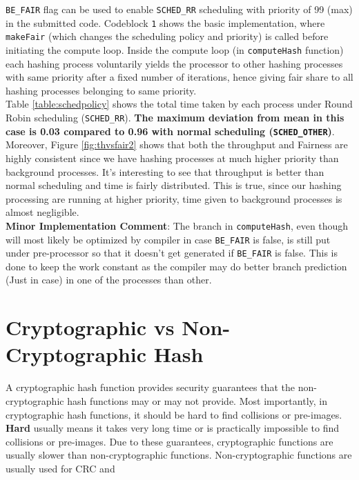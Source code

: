 \documentclass[10pt] {article}
\begin{document}
\noindent \texttt{BE\_FAIR} flag can be used to enable \texttt{SCHED\_RR} scheduling with priority of 99 (max) in the submitted code. Codeblock \texttt{1} shows the basic implementation, where \texttt{makeFair} (which changes the scheduling policy and priority) is called before initiating the compute loop. Inside the compute loop (in \texttt{computeHash} function) each hashing process voluntarily yields the processor to other hashing processes with same priority after a fixed number of iterations, hence giving fair share to all hashing processes belonging to same priority.\\

\noindent Table \ref{table:schedpolicy} shows the total time taken by each process under Round Robin scheduling (\texttt{SCHED\_RR}). \textbf{The maximum deviation from mean in this case is 0.03 compared to 0.96 with normal scheduling (\texttt{SCHED\_OTHER})}. \\

\noindent Moreover, Figure \ref{fig:thvsfair2} shows that both the throughput and Fairness are highly consistent since we have hashing processes at much higher priority than background processes. It's interesting to see that throughput is better than normal scheduling and time is fairly distributed. This is true, since our hashing processing are running at higher priority, time given to background processes is almost negligible. \\

\noindent \textbf{Minor Implementation Comment}: The branch in \texttt{computeHash}, even though will most likely be optimized by compiler in case \texttt{BE\_FAIR} is false, is still put under pre-processor so that it doesn't get generated if \texttt{BE\_FAIR} is false. This is done to keep the work constant as the compiler may do better branch prediction (Just in case) in one of the processes than other.

\section{Cryptographic vs Non-Cryptographic Hash}
A cryptographic hash function provides security guarantees that the non-cryptographic hash functions may or may not provide. Most importantly, in cryptographic hash functions, it should be hard to find collisions or pre-images. \textbf{Hard} usually means it takes very long time or is practically impossible to find collisions or pre-images. Due to these guarantees, cryptographic functions are usually slower than non-cryptographic functions. Non-cryptographic functions are usually used for CRC and 
\end{document}
